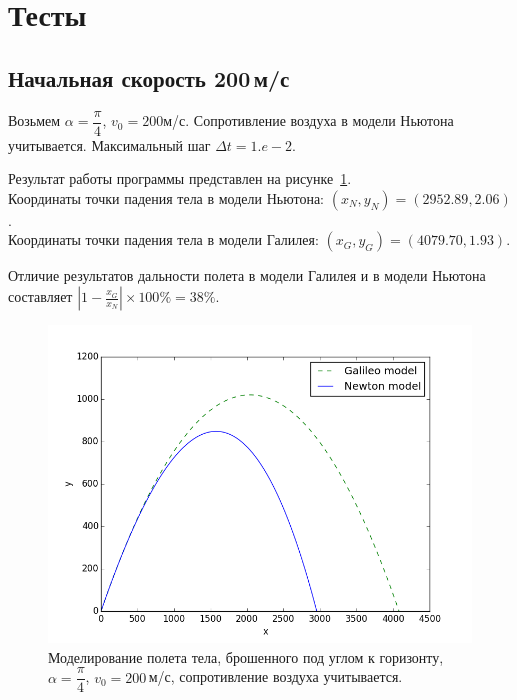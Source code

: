 \documentclass[14pt,russian]{extarticle}
\begin{document}
\section{Тесты}
\subsection{Начальная скорость 200\,м/с}
Возьмем $\alpha = \dfrac{\pi}{4}$, $v_0 = 200$м/с. Сопротивление воздуха в модели Ньютона учитывается. Максимальный шаг $\Delta t=1.e-2$.

Результат работы программы представлен на рисунке~\ref{img:1_a-45_v-200}.\\
Координаты точки падения тела в модели Ньютона: $(x_N, y_N) = (2952.89, 2.06)$. \\
Координаты точки падения тела в модели Галилея: $(x_G, y_G) = (4079.70, 1.93)$.

Отличие результатов дальности полета в модели Галилея и в модели Ньютона составляет $|1-\frac{x_G}{x_N}| \times 100\% = 38\% $.
\begin{figure}[h!]
	\centering
		\includegraphics[width=1\linewidth]{img/1_a-45_v-200.png}
	\caption{Моделирование полета тела, брошенного под углом к горизонту, $\alpha = \dfrac{\pi}{4}$, $v_0 = 200\,$м/с, сопротивление воздуха учитывается.}
	\label{img:1_a-45_v-200}
\end{figure}
\end{document}
